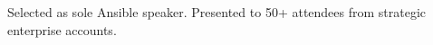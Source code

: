 \documentclass[]{deedy-resume-reversed}
\begin{document}
\begin{minipage}[t]{0.29\textwidth}
Selected as sole Ansible speaker. Presented to 50+ attendees from strategic enterprise accounts.







\end{minipage} %
\end{document}
